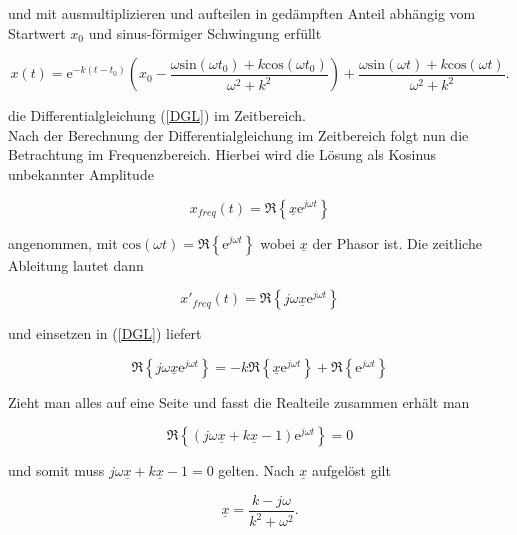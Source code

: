und mit ausmultiplizieren und aufteilen in gedämpften Anteil abhängig vom Startwert $x_0$ und sinus-förmiger Schwingung erfüllt

\begin{equation}
	x(t) = \mathrm{e}^{-k(t-t_0)}\left(x_0-\frac{\omega \mathrm{sin}(\omega t_0)+k\mathrm{cos}(\omega t_0)}{\omega^2+k^2}\right)+\frac{\omega \mathrm{sin}(\omega t)+k\mathrm{cos}(\omega t)}{\omega^2+k^2}.
	\label{allgemeineLösung}
\end{equation}

die Differentialgleichung (\ref{DGL}) im Zeitbereich.\\

Nach der Berechnung der Differentialgleichung im Zeitbereich folgt nun die Betrachtung im Frequenzbereich. Hierbei wird die Lösung als Kosinus unbekannter Amplitude

\begin{equation*}
	x_{freq} (t) = \Re \left\{\underline{x}\mathrm{e}^{j\omega t}\right\}
\end{equation*}

angenommen, mit $\mathrm{cos}(\omega t) = \Re\left\{\mathrm{e}^{j\omega t}\right\}$ wobei $\underline{x}$ der Phasor ist. Die zeitliche Ableitung lautet dann 

\begin{equation*}
	x'_{freq}(t) = \Re \left\{j\omega \underline{x} \mathrm{e}^{j\omega t}\right\}
\end{equation*}

und einsetzen in (\ref{DGL}) liefert

\begin{equation*}
	\Re \left\{j\omega \underline{x} \mathrm{e}^{j\omega t}\right\} = -k\Re\left\{\underline{x}\mathrm{e}^{j\omega t}\right\} + \Re\left\{\mathrm{e}^{j\omega t}\right\}
\end{equation*}

Zieht man alles auf eine Seite und fasst die Realteile zusammen erhält man 

\begin{equation*}
	\Re \left\{(j\omega \underline{x} + k\underline{x} - 1)\mathrm{e}^{j\omega t}\right\} = 0
\end{equation*}

und somit muss $j\omega \underline{x} + k\underline{x} - 1 = 0$ gelten. Nach $\underline{x}$ aufgelöst gilt 

\begin{equation*}
	\underline{x} = \frac{k-j\omega}{k^2+\omega^2}.
\end{equation*}

